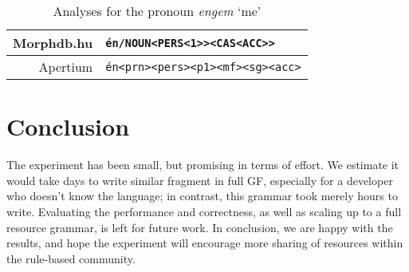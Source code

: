 \documentclass[10pt,a4paper]{article}
\begin{document}
\begin{table}[t]
\center
    \begin{tabular}{r|l}
   Morphdb.hu  & \texttt{\'{e}n/NOUN<PERS<1>><CAS<ACC>>} \\ \hline
   Apertium    & \texttt{\'{e}n<prn><pers><p1><mf><sg><acc>} \\
    \end{tabular}
\label{table:engem}
\caption{Analyses for the pronoun \emph{engem} `me'}
\end{table}

\vspace{-2mm}

\section{Conclusion}

The experiment has been small, but promising in terms of effort.
We estimate it would take days to write similar fragment in full GF,
especially for a developer who doesn't know the language; in contrast,
this grammar took merely hours to write.
Evaluating the performance and correctness, as well as scaling up to a
full resource grammar, is left for future work.
In conclusion, we are happy with the results, and hope the experiment
will encourage more sharing of resources within the rule-based community.





\end{document}
